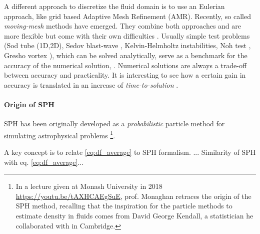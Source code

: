 A different approach to discretize the fluid domain is to use an Eulerian approach, like grid based Adaptive Mesh Refinement (AMR).
Recently, so called \emph{moving-mesh} methods have emerged. They combine both approaches and are more flexible but come with their own difficulties \citep{Springel2010, Shadowfax, Arepo}.
Usually simple test problems (Sod tube (1D,2D), Sedov blast-wave \citep{Sedov1946}, Kelvin-Helmholtz instabilities, Noh test \citep{Noh1987}, Gresho vortex \citep{Gresho1990}),
which can be solved analytically, serve as a benchmark for the accuracy of the numerical solution, \citep[e.g. by measuring the distance of the two solution with an L2-norm in the whole domain, ][]{BorrowSphenix}.
Numerical solutions are always a trade-off between accuracy and practicality.
It is interesting to see how a certain gain in accuracy is translated in an increase of \emph{time-to-solution} \citep{Borrow2019}.

\paragraph{Origin of SPH}
SPH has been originally developed as a \emph{probabilistic} particle method for simulating astrophysical problems \citep{Lucy1977, Gingold1977, Monaghan2005}\footnote{In a lecture given at Monash University in 2018 \url{https://youtu.be/tAXHCAEgSuE}, prof. Monaghan retraces the origin of the SPH method, recalling that the inspiration for the particle methods to estimate density in fluids comes from David George Kendall, a statistician he collaborated with in Cambridge.}.

A key concept is to relate \eqref{eq:df_average} to SPH formalism.
... Similarity of SPH with eq. \eqref{eq:df_average}... %





